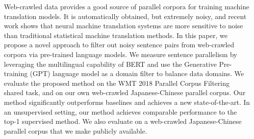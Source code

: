 Web-crawled data provides a good source of parallel corpora for training machine translation models. It is automatically obtained, but extremely noisy, and recent work shows that neural machine translation systems are more sensitive to noise than traditional statistical machine translation methods. In this paper, we propose a novel approach to filter out noisy sentence pairs from web-crawled corpora via pre-trained language models. We measure sentence parallelism by leveraging the multilingual capability of BERT and use the Generative Pre-training (GPT) language model as a domain filter to balance data domains. We evaluate the proposed method on the WMT 2018 Parallel Corpus Filtering shared task, and on our own web-crawled Japanese-Chinese parallel corpus. Our method significantly outperforms baselines and achieves a new state-of-the-art. In an unsupervised setting, our method achieves comparable performance to the top-1 supervised method. We also evaluate on a web-crawled Japanese-Chinese parallel corpus that we make publicly available.
